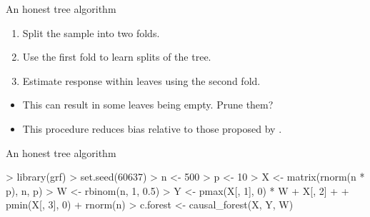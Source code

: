 \documentclass[xcolor={dvipsnames},handout]{beamer}
\begin{document}

\begin{frame}{An honest tree algorithm}

\begin{enumerate}
\item Split the sample into two folds.
\item Use the first fold to learn splits of the tree.
\item Estimate response within leaves using the second fold.
\end{enumerate}

\begin{itemize}
\item This can result in some leaves being empty.  Prune them?
\item This procedure reduces bias relative to those proposed by \cite{breiman2001random}.
\end{itemize}

\end{frame}



\begin{frame}[fragile]{An honest tree algorithm}

\begin{Schunk}
\begin{Sinput}
> library(grf)
> set.seed(60637)
> n <- 500
> p <- 10
> X <- matrix(rnorm(n * p), n, p)
> W <- rbinom(n, 1, 0.5)
> Y <- pmax(X[, 1], 0) * W + X[, 2] +
+   pmin(X[, 3], 0) + rnorm(n)
> c.forest <- causal_forest(X, Y, W)
\end{Sinput}
\end{Schunk}



\end{frame}
\end{document}

